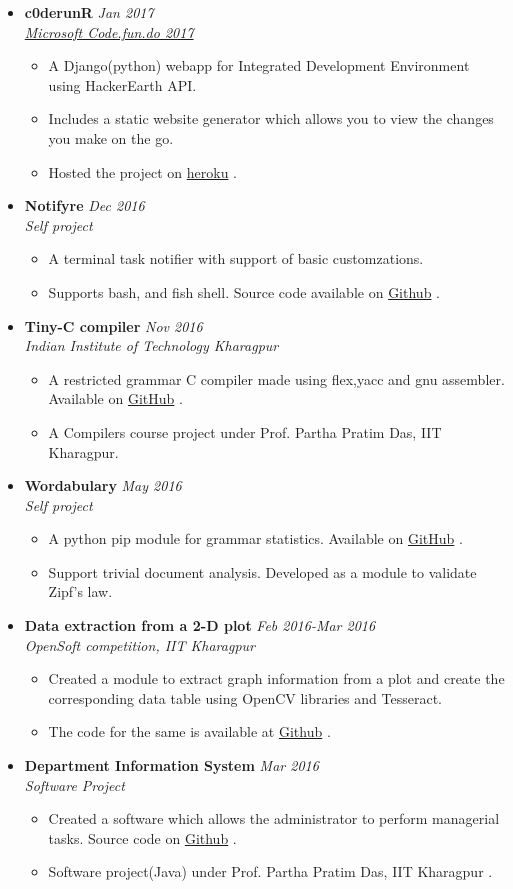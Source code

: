 \documentclass[10pt,a4paper]{moderncv}
\newcommand{\experience}[4]{
  \vspace{0.1cm}
  \item \textbf{\large{#1}} \hfill\textit{#3}\\\textit{#2}
  \begin{itemize}[leftmargin=*]
    \setlength\itemsep{0em} #4
  \end{itemize}
}
\newcommand{\project}[3]{
  \vspace{0.1cm}
  \item \textbf{\large{#1}} \hfill\textit{#2}\\\textit{Self project}
  \begin{itemize}[leftmargin=*]
    \setlength\itemsep{0em} #3
  \end{itemize}
}
\newcommand{\newlink}[2]{
  \href{#1}{\color{blue}#2}
}
\begin{document}
\begin{itemize}
  \experience{c0derunR}{\href{https://drive.google.com/open?id=0B5iU6cWw36rOOG9yZ2hxSTFTUEk}{Microsoft Code.fun.do 2017}}{Jan 2017}{
  	\item A Django(python) webapp for Integrated Development Environment using HackerEarth API.
  	\item Includes a static website generator which allows you to view the changes you make on the go.
  	\item Hosted the project on \newlink{http://c0derunr.herokuapp.com/}{heroku}.
  }

  \project{Notifyre}{Dec 2016}{
	\item A terminal task notifier with support of basic customzations. 
	\item Supports bash, and fish shell. Source code available on \newlink{https://github.com/kaustubhhiware/NotiFyre}{Github}.
  }
  
  \experience{Tiny-C compiler}{Indian Institute of Technology Kharagpur}{Nov 2016}{
  \item A restricted grammar C compiler made using flex,yacc and gnu assembler. Available on  \newlink{https://github.com/kaustubhhiware/cOMPILER}{GitHub}.
  \item A Compilers course project under Prof. Partha Pratim Das, IIT Kharagpur.
  }

  \project{Wordabulary}{May 2016}{
    \item A python pip module for grammar statistics. Available on \newlink{https://github.com/kaustubhhiware/Wordabulary}{GitHub}.
    \item Support trivial document analysis. Developed as a module to validate Zipf's law.
  }

  \experience{Data extraction from a 2-D plot}{OpenSoft competition, IIT Kharagpur}{Feb 2016-Mar 2016}{
  	\item Created a module to extract graph information from a plot and create the corresponding data table using OpenCV libraries and Tesseract.
  	\item The code for the same is available at \newlink{https://github.com/Azad-Hall/open-soft-2015-2016}{Github}.
  }

  \experience{Department Information System}{Software Project}{Mar 2016}{
  \item Created a software which allows the administrator to perform managerial tasks. Source code on \newlink{https://github.com/kaustubhhiware/DepInfosys}{Github}.
  \item Software project(Java) under Prof. Partha Pratim Das, IIT Kharagpur .
  }
\end{itemize}
\end{document}
